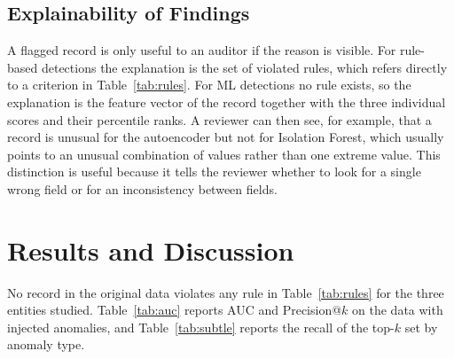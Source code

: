 \documentclass[conference]{IEEEtran}
\begin{document}
\subsection{Explainability of Findings}
A flagged record is only useful to an auditor if the reason is visible. For rule-based detections the explanation is the set of violated rules, which refers directly to a criterion in Table~\ref{tab:rules}. For ML detections no rule exists, so the explanation is the feature vector of the record together with the three individual scores and their percentile ranks. A reviewer can then see, for example, that a record is unusual for the autoencoder but not for Isolation Forest, which usually points to an unusual combination of values rather than one extreme value. This distinction is useful because it tells the reviewer whether to look for a single wrong field or for an inconsistency between fields.

\section{Results and Discussion}\label{sec:results}
No record in the original data violates any rule in Table~\ref{tab:rules} for the three entities studied. Table~\ref{tab:auc} reports AUC and Precision@$k$ on the data with injected anomalies, and Table~\ref{tab:subtle} reports the recall of the top-$k$ set by anomaly type.
\end{document}
